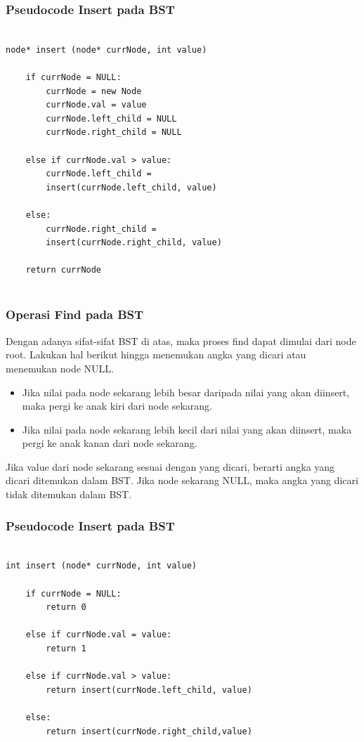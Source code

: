 \begin{frame}[fragile]
\frametitle{Pseudocode Insert pada BST}

\begin{lstlisting}

node* insert (node* currNode, int value)

    if currNode = NULL:
        currNode = new Node
        currNode.val = value
        currNode.left_child = NULL
        currNode.right_child = NULL
	
    else if currNode.val > value:
        currNode.left_child =
        insert(currNode.left_child, value)
	
    else:
        currNode.right_child = 
        insert(currNode.right_child, value)
		
    return currNode
		
\end{lstlisting}
\end{frame}

\begin{frame}
\frametitle{Operasi Find pada BST}

Dengan adanya sifat-sifat BST di atas, maka proses find dapat dimulai dari node root. Lakukan hal berikut hingga menemukan angka yang dicari atau menemukan node NULL.
\begin{itemize}
	\item Jika nilai pada node sekarang lebih besar daripada nilai yang akan diinsert, maka pergi ke anak kiri dari node sekarang.
	\item Jika nilai pada node sekarang lebih kecil dari nilai yang akan diinsert, maka pergi ke anak kanan dari node sekarang.\newline
\end{itemize}
Jika value dari node sekarang sesuai dengan yang dicari, berarti angka yang dicari ditemukan dalam BST.
\newline\newline
Jika node sekarang NULL, maka angka yang dicari tidak ditemukan dalam BST.
\end{frame}

\begin{frame}[fragile]
\frametitle{Pseudocode Insert pada BST}

\begin{lstlisting}

int insert (node* currNode, int value)

    if currNode = NULL:
        return 0
    
    else if currNode.val = value:
        return 1
        
    else if currNode.val > value:
        return insert(currNode.left_child, value)
        
    else:
        return insert(currNode.right_child,value)
		
\end{lstlisting}
\end{frame}

